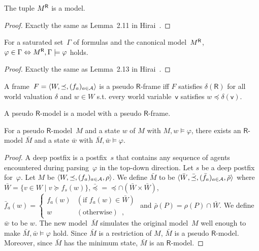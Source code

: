 \begin{lemma}
 The tuple ${M}^{\mathsf R}$ is a model.
\end{lemma}
\begin{proof}
 Exactly the same as Lemma~2.11 in Hirai~\cite{hirailpar}.
\end{proof}

\begin{proposition}
 \label{X}
 For a saturated set~$\Gamma$ of formulas and the canonical model~${M}^{\mathsf R}$,
 $\varphi\in\Gamma\Leftrightarrow {M}^{\mathsf R},\Gamma\models\varphi$ holds.
\end{proposition}
\begin{proof}
 Exactly the same as Lemma~2.13 in Hirai~\cite{hirailpar}.
\end{proof}

\begin{definition}
 A frame~$F = \langle{W,\preceq, (f_a)_{a\in\mathcal A}}\rangle$
 is a pseudo $\mathsf R$-frame iff $F$ satisfies
 $\delta(\mathsf R)$ for all world valuation
 $\delta$ and $w\in W$ s.t.
 every world variable~$\mathsf v$ satisfies
 $w\preceq \delta(\mathsf v)$.
\end{definition}
 A pseudo $\mathsf R$-model is a model with a pseudo $\mathsf R$-frame.

\begin{lemma}
 \label{pseudo-real}
 For a pseudo $\mathsf R$-model~$M$ and a state $w$ of $M$ with
 $M,w\models\varphi$,
 there exists an $\mathsf R$-model $\bar M$ and a state $\bar w$
 with $\bar M,\bar w\models\varphi$.
\end{lemma}
\begin{proof}
 A deep postfix is a postfix~$s$ that contains any sequence of agents
 encountered during parsing~$\varphi$ in the top-down direction.
 Let $s$ be a deep postfix for~$\varphi$. Let $M$ be
 $\langle{W,\preceq,(f_a)_{a\in\mathcal A},\rho}\rangle$.
 We define $\bar M$ to be $\langle{\bar W,\bar\preceq,
 (\bar f_a)_{a\in\mathcal A},\bar \rho}\rangle$ where
 $\bar W=\{v\in W\mid v\succeq f_s(w)\}$,$\bar\preceq =
 \preceq\cap (\bar W\times\bar W)$,
 $\bar f_a(w)= \begin{cases}
		    f_a(w)&(\mbox{if }f_a(w)\in\bar W)\\
		    w&(\mbox{otherwise})\enspace,
		   \end{cases}$
 and $\bar \rho(P) =\rho(P)\cap\bar W$.
 We define $\bar w$ to be $w$.
 The new model~$\bar M$ simulates the original model~$M$ well enough
 to make $\bar M,\bar w\models\varphi$ hold.
 Since $\bar M$ is a restriction of $M$, $\bar M$ is a pseudo
 $\mathsf R$-model.
 Moreover, since $\bar M$ has the minimum state, $\bar M$ is an
 $\mathsf R$-model.
\end{proof}

